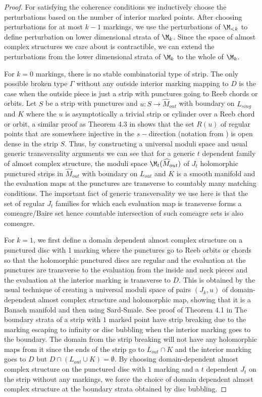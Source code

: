 \begin{proof}
For satisfying the coherence conditions we inductively choose the perturbations based on the number of interior marked points. After choosing perturbations for at most $k-1$ markings, we use the perturbations of $\M_{<k}$ to define perturbation on lower dimensional strata of $\M_k$. Since the space of almost complex structures we care about is contractible, we can extend the perturbations from the lower dimensional strata of $\M_k$ to the whole of $\M_k$.

For $k=0$ markings, there is no stable combinatorial type of strip. The only possible broken type $\Gamma$ without any outside interior marking mapping to $D$ is the case when the outside piece is just a strip with punctures going to Reeb chords or orbits. Let $S$ be a strip with punctures and $u:S \to \widehat M_{out}$ with boundary on $L_{sing}$ and $K$ where the $u$ is asymptotically a trivial strip or cylinder over a Reeb chord or orbit, a similar proof as Theorem 4.3 in \cite{FlHStrans}  shows that the set $R(u)$ of regular points that are somewhere injective in the $s-$direction (notation from \cite{FlHStrans} ) is open dense in the strip $S$. Thus, by constructing a universal moduli space and usual generic transversality arguments we can see that for a generic $t$ dependent family of almost complex structure, the moduli space $\M_t(\widehat M_{out})$ of $J_t$ holomorphic punctured strips in $\widehat M_{out}$ with boundary on $L_{out}$ and $K$ is a smooth manifold and the evaluation maps at the punctures are transverse to countably many matching conditions. The important fact of generic transversality we use here is that the set of regular $J_t$ families  for which each evaluation map is transverse forms a comeagre/Baire set hence countable intersection of  such comeagre sets is also comeagre.

For $k=1$, we first define a domain dependent almost complex structure on a punctured disc with 1 marking where the punctures go to Reeb orbits or chords so that the holomorphic punctured discs are regular and the evaluation at the punctures are transverse to the evaluation from the inside and neck pieces and the evaluation at the interior marking is transverse to $D$. This is obtained by the usual technique of creating a universal moduli space of pairs $(J_k,u)$  of domain-dependent almost complex structure and holomorphic map, showing that it is a Banach manifold and then using Sard-Smale. See proof of Theorem 4.1 in \cite{charwoodstabil}  The boundary strata of a strip with $1$ marked point have strip breaking due to the marking escaping to infinity or disc bubbling when the interior marking goes to the boundary. The domain from the strip breaking will not have any holomorphic maps from it since the ends of the strip go to $L_{out}\cap K$ and the interior marking goes to $D$ but $D\cap (L_{out} \cup K) = \emptyset $.  By choosing domain-dependent almost complex structure on the punctured disc with $1$ marking and a $t$ dependent $J_t$ on the strip without any markings, we force the choice of domain dependent almost complex structure at the boundary strata obtained by disc bubbling. 


\end{proof}
